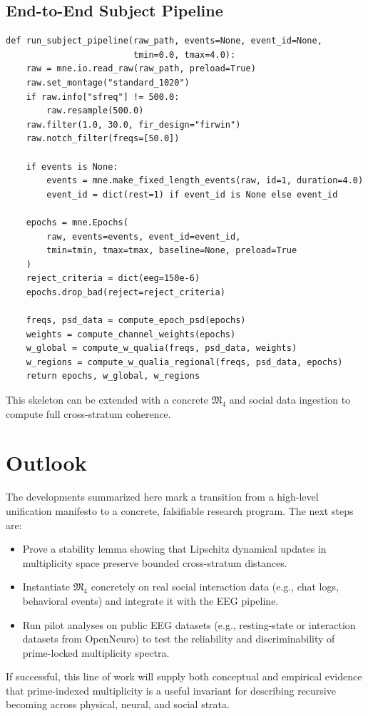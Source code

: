 \documentclass[11pt]{article}
\begin{document}
\subsection{End-to-End Subject Pipeline}

\begin{verbatim}
def run_subject_pipeline(raw_path, events=None, event_id=None,
                         tmin=0.0, tmax=4.0):
    raw = mne.io.read_raw(raw_path, preload=True)
    raw.set_montage("standard_1020")
    if raw.info["sfreq"] != 500.0:
        raw.resample(500.0)
    raw.filter(1.0, 30.0, fir_design="firwin")
    raw.notch_filter(freqs=[50.0])

    if events is None:
        events = mne.make_fixed_length_events(raw, id=1, duration=4.0)
        event_id = dict(rest=1) if event_id is None else event_id

    epochs = mne.Epochs(
        raw, events=events, event_id=event_id,
        tmin=tmin, tmax=tmax, baseline=None, preload=True
    )
    reject_criteria = dict(eeg=150e-6)
    epochs.drop_bad(reject=reject_criteria)

    freqs, psd_data = compute_epoch_psd(epochs)
    weights = compute_channel_weights(epochs)
    w_global = compute_w_qualia(freqs, psd_data, weights)
    w_regions = compute_w_qualia_regional(freqs, psd_data, epochs)
    return epochs, w_global, w_regions
\end{verbatim}

This skeleton can be extended with a concrete \(\mathfrak{M}_4\) and social data ingestion to compute full cross-stratum coherence.

\section{Outlook}

The developments summarized here mark a transition from a high-level unification manifesto to a concrete, falsifiable research program. The next steps are:

\begin{itemize}
  \item Prove a stability lemma showing that Lipschitz dynamical updates in multiplicity space preserve bounded cross-stratum distances.
  \item Instantiate \(\mathfrak{M}_4\) concretely on real social interaction data (e.g., chat logs, behavioral events) and integrate it with the EEG pipeline.
  \item Run pilot analyses on public EEG datasets (e.g., resting-state or interaction datasets from OpenNeuro) to test the reliability and discriminability of prime-locked multiplicity spectra.
\end{itemize}

If successful, this line of work will supply both conceptual and empirical evidence that prime-indexed multiplicity is a useful invariant for describing recursive becoming across physical, neural, and social strata.

\nocite{*}

 
\end{document}
